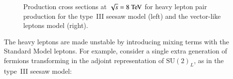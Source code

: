 \begin{figure}[htbp]
	\centering
	\hfill
	\caption{Production cross sections at $\sqrt{s}=8 \TeV$ for heavy lepton pair production for the type~III seesaw model (left) and the vector-like leptons model (right).}
	\label{fig:resonance-production-cross-sections}
\end{figure}


The heavy leptons are made unstable by introducing mixing terms with the Standard Model leptons. For example, consider a single extra generation of fermions transforming in the adjoint representation of $\mathrm{SU}(2)_L$, as in the type~III seesaw model:

